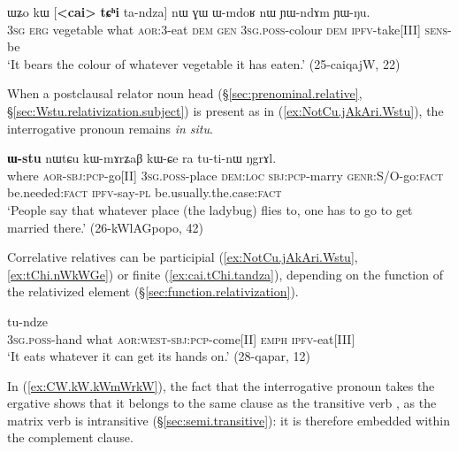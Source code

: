 \begin{exe}
\ex \label{ex:cai.tChi.tandza}
\gll ɯʑo kɯ [\textbf{<cai>} \textbf{tɕʰi} ta-ndza] nɯ ɣɯ ɯ-mdoʁ nɯ ɲɯ-ndɤm ɲɯ-ŋu. \\
\textsc{3sg} \textsc{erg} vegetable what \textsc{aor}:3\flobv{}-eat \textsc{dem} \textsc{gen} \textsc{3sg}.\textsc{poss}-colour \textsc{dem} \textsc{ipfv}-take[III] \textsc{sens}-be \\
\glt  `It bears the colour of whatever vegetable it has eaten.' (25-caiqajW, 22)
\end{exe}

When a postclausal relator noun head (§\ref{sec:prenominal.relative}, §\ref{sec:Wstu.relativization.subject}) is present as in (\ref{ex:NotCu.jAkAri.Wstu}), the interrogative pronoun remains \textit{in situ}.

\begin{exe}
\ex \label{ex:NotCu.jAkAri.Wstu}
 \textbf{ɯ-stu} nɯtɕu kɯ-mɤrʑaβ kɯ-ɕe ra tu-ti-nɯ ŋgrɤl. \\
where \textsc{aor}-\textsc{sbj}:\textsc{pcp}-go[II] \textsc{3sg}.\textsc{poss}-place \textsc{dem}:\textsc{loc} \textsc{sbj}:\textsc{pcp}-marry \textsc{genr}:S/O-go:\textsc{fact} be.needed:\textsc{fact} \textsc{ipfv}-say-\textsc{pl} be.usually.the.case:\textsc{fact} \\
\glt `People say that whatever place (the ladybug) flies to, one has to go to get married there.' (26-kWlAGpopo, 42)
\end{exe}

Correlative relatives can be participial (\ref{ex:NotCu.jAkAri.Wstu}, \ref{ex:tChi.nWkWGe}) or finite (\ref{ex:cai.tChi.tandza}), depending on the function of the relativized element (§\ref{sec:function.relativization}).

\begin{exe}
\ex \label{ex:tChi.nWkWGe}
 tu-ndze \\
\textsc{3sg}.\textsc{poss}-hand what \textsc{aor}:\textsc{west}-\textsc{sbj}:\textsc{pcp}-come[II] \textsc{emph} \textsc{ipfv}-eat[III] \\
\glt `It eats whatever it can get its hands on.' (28-qapar, 12)
\end{exe}


 In (\ref{ex:CW.kW.kWmWrkW}), the fact that the interrogative pronoun  takes the ergative shows that it belongs to the same clause as the transitive verb , as the matrix verb  is intransitive (§\ref{sec:semi.transitive}): it is therefore embedded within the complement clause.

